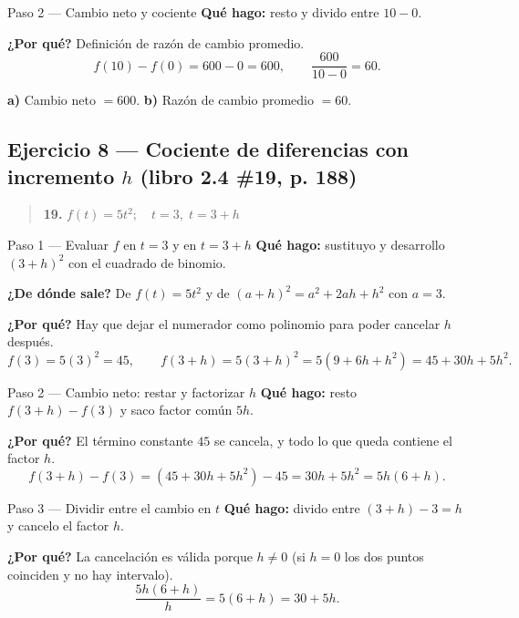 \documentclass[11pt]{article}
\begin{document}
\begin{paso}{Paso 2 --- Cambio neto y cociente}
\textbf{Qué hago:} resto y divido entre $10-0$.

\textbf{¿Por qué?} Definición de razón de cambio promedio.
\[
f(10)-f(0)=600-0=600,\qquad \frac{600}{10-0}=60.
\]
\end{paso}

\begin{resp}
\textbf{a)} Cambio neto $=600$. \qquad \textbf{b)} Razón de cambio promedio $=60$.
\end{resp}

\subsection*{Ejercicio 8 — Cociente de diferencias con incremento $h$ (libro 2.4 \#19, p. 188)}

\begin{quote}
\textbf{19.} $f(t)=5t^2;\quad t=3,\;t=3+h$
\end{quote}

\begin{paso}{Paso 1 --- Evaluar $f$ en $t=3$ y en $t=3+h$}
\textbf{Qué hago:} sustituyo y desarrollo $(3+h)^2$ con el cuadrado de binomio.

\textbf{¿De dónde sale?} De $f(t)=5t^2$ y de $(a+h)^2=a^2+2ah+h^2$ con $a=3$.

\textbf{¿Por qué?} Hay que dejar el numerador como polinomio para poder cancelar $h$ después.
\[
f(3)=5(3)^2=45,\qquad f(3+h)=5(3+h)^2=5(9+6h+h^2)=45+30h+5h^2.
\]
\end{paso}

\begin{paso}{Paso 2 --- Cambio neto: restar y factorizar $h$}
\textbf{Qué hago:} resto $f(3+h)-f(3)$ y saco factor común $5h$.

\textbf{¿Por qué?} El término constante $45$ se cancela, y todo lo que queda contiene el factor $h$.
\[
f(3+h)-f(3)=(45+30h+5h^2)-45=30h+5h^2=5h(6+h).
\]
\end{paso}

\begin{paso}{Paso 3 --- Dividir entre el cambio en $t$}
\textbf{Qué hago:} divido entre $(3+h)-3=h$ y cancelo el factor $h$.

\textbf{¿Por qué?} La cancelación es válida porque $h\neq 0$ (si $h=0$ los dos puntos coinciden y no hay intervalo).
\[
\frac{5h(6+h)}{h}=5(6+h)=30+5h.
\]
\end{paso}
\end{document}
